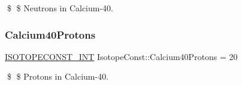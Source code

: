 \$ \$ Neutrons in Calcium-\/40. \mbox{\label{group___isotope_const-_calcium-_ca40_ga872fcb7995c634f64b32d61a42a71a38}} 
\subsubsection{\texorpdfstring{Calcium40\+Protons}{Calcium40Protons}}
{\footnotesize\ttfamily \mbox{\hyperlink{group___isotope_const-_macros_ga5f18360b3e99483a35c32d789e62621c}{I\+S\+O\+T\+O\+P\+E\+C\+O\+N\+S\+T\+\_\+\+I\+NT}} Isotope\+Const\+::\+Calcium40\+Protons = 20}

\$ \$ Protons in Calcium-\/40. 
